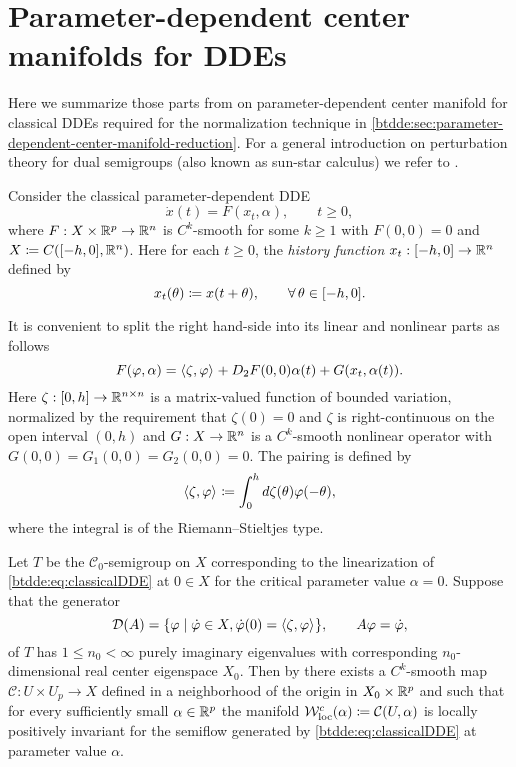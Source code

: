\section{Parameter-dependent center manifolds for DDEs}
\label{btdde:sec:sunstar}

Here we summarize those parts from \cite{Switching2019} on parameter-dependent
center manifold for classical DDEs required for the normalization technique in
\cref{btdde:sec:parameter-dependent-center-manifold-reduction}. For a general
introduction on perturbation theory for dual semigroups (also known as sun-star
calculus) we refer to \cite{diekmann1995delay}.

Consider the classical parameter-dependent DDE
\begin{equation}
    \tag{DDE}
    \label{btdde:eq:classicalDDE}
    \dot{x}(t)= F(x_t, \alpha), \qquad t \ge 0,
\end{equation}
where $F: X \times \mathbb{R}^p \to \mathbb{R}^n$ is $C^k$-smooth for some $k \ge 1$ with
$F(0,0) = 0$ and $X \coloneqq C([-h,0],\mathbb{R}^n)$. Here for each $t \ge 0$, the
\emph{history function} $x_t : [-h,0] \to \mathbb{R}^n$ defined by
\[
  x_t(\theta) \coloneqq x(t + \theta), \qquad \forall\,\theta \in [-h,0].
\]

It is convenient to split the right hand-side into its linear and nonlinear
parts as follows
\begin{equation}
  \label{btdde:eq:classicalDDE12}
      F(\varphi,\alpha)= \langle \zeta,\varphi \rangle_{} + D_2F(0,0)\alpha(t) + G(x_t, \alpha(t)).
\end{equation}
Here $\zeta : [0,h] \to \mathbb{R}^{n \times n}$ is a matrix-valued function of
bounded variation, normalized by the requirement that $\zeta(0) = 0$ and
$\zeta$ is right-continuous on the open interval $(0,h)$ and $G : X \to \mathbb{R}^n$
is a $C^k$-smooth nonlinear operator with $G(0,0) = G_1(0,0) = G_2(0,0) = 0$.
The pairing is defined by
%
\begin{equation}
  \label{btdde:eq:lindde_shorthand}
  \langle \zeta,\varphi \rangle_{} \coloneqq \int_0^h{d\zeta(\theta)\varphi(-\theta}),
\end{equation}
where the integral is of the Riemann--Stieltjes type.

Let $T$ be the $\mathcal{C}_0$-semigroup on $X$ corresponding to the
linearization of \cref{btdde:eq:classicalDDE} at $0 \in X$ for the critical parameter
value $\alpha = 0$. Suppose that the generator 
\[
    \mathcal{D}{(A)}  = \{ \varphi \mid \dot {\varphi} \in X, \dot {\varphi}(0) = \langle \zeta,\varphi \rangle_{}\}, 
    \qquad 
    A\varphi = \dot {\varphi},
\]
of $T$ has $1 \le n_0 < \infty$ purely imaginary eigenvalues with corresponding
$n_0$-dimensional real center eigenspace $X_0$. Then by \cite[Corollary
20]{Switching2019} there exists a $C^k$-smooth map $\mathcal{C} : U \times U_p
\to X$ defined in a neighborhood of the origin in $X_0 \times \mathbb{R}^p$ and such
that for every sufficiently small $\alpha \in \mathbb{R}^p$ the manifold $\mathcal{W}^c_{\text{loc}}(\alpha)
\coloneqq \mathcal{C}(U,\alpha)$ is locally positively invariant for the semiflow
generated by \cref{btdde:eq:classicalDDE} at parameter value $\alpha$.


